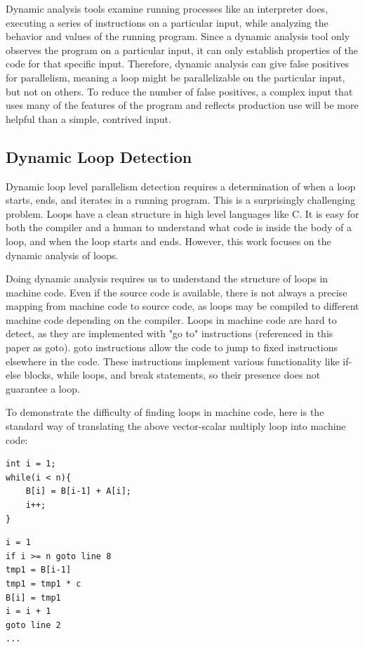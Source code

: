 \documentclass[12pt,twoside]{reedthesis}
\begin{document}
			Dynamic analysis tools examine running processes like an interpreter does, executing a series of instructions on a particular input, while analyzing the behavior and values of the running program. Since a dynamic analysis tool only observes the program on a particular input, it can only establish properties of the code for that specific input. Therefore, dynamic analysis can give false positives for parallelism, meaning a loop might be parallelizable on the particular input, but not on others. To reduce the number of false positives, a complex input that uses many of the features of the program and reflects production use will be more helpful than a simple, contrived input. 
			
		\subsection{Dynamic Loop Detection}\label{s:loopprof-detection}
		
		Dynamic loop level parallelism detection requires a determination of when a loop starts, ends, and iterates in a running program.
		This is a surprisingly challenging problem. 
		Loops have a clean structure in high level languages like C. It is easy for both the compiler and a human to understand what code is inside the body of a loop, and when the loop starts and ends. However, this work focuses on the dynamic analysis of loops. 
		
		Doing dynamic analysis requires us to understand the structure of loops in machine code. Even if the source code is available, there is not always a precise mapping from machine code to source code, as loops may be compiled to different machine code depending on the compiler. Loops in machine code are hard to detect, as they are implemented with "go to" instructions (referenced in this paper as goto). goto instructions allow the code to jump to fixed instructions elsewhere in the code. These instructions implement various functionality like if-else blocks, while loops, and break statements, so their presence does not guarantee a loop.
		
		To demonstrate the difficulty of finding loops in machine code, here is the standard way of translating the above vector-scalar multiply loop into machine code:
		

		\begin{lstlisting}
int i = 1;
while(i < n){
	B[i] = B[i-1] + A[i];
	i++;
}
		\end{lstlisting}
		\begin{lstlisting}
i = 1
if i >= n goto line 8
tmp1 = B[i-1]
tmp1 = tmp1 * c
B[i] = tmp1
i = i + 1
goto line 2
...
		\end{lstlisting} 
		
\end{document}
